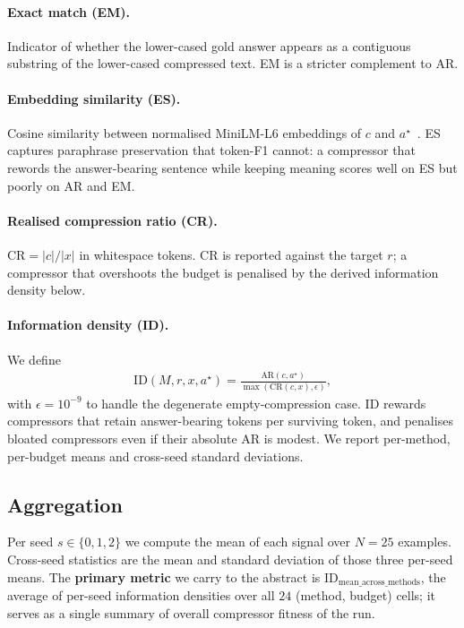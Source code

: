 \documentclass[11pt]{article}
\begin{document}
\paragraph{Exact match (EM).}
Indicator of whether the lower-cased gold answer appears as a
contiguous substring of the lower-cased compressed text. EM is a
stricter complement to AR.

\paragraph{Embedding similarity (ES).}
Cosine similarity between normalised MiniLM-L6 embeddings of $c$ and
$a^{\star}$~\citep{reimers2019sentencebert}. ES captures paraphrase
preservation that token-F1 cannot: a compressor that rewords the
answer-bearing sentence while keeping meaning scores well on ES but
poorly on AR and EM.

\paragraph{Realised compression ratio (CR).}
$\mathrm{CR} = |c| / |x|$ in whitespace tokens. CR is reported against
the target $r$; a compressor that overshoots the budget is penalised
by the derived information density below.

\paragraph{Information density (ID).}
We define
\begin{align*}
 \mathrm{ID}(M, r, x, a^{\star}) =
 \frac{\mathrm{AR}(c, a^{\star})}{\max(\mathrm{CR}(c, x), \epsilon)},
\end{align*}
with $\epsilon = 10^{-9}$ to handle the degenerate empty-compression
case. ID rewards compressors that retain answer-bearing tokens per
surviving token, and penalises bloated compressors even if their
absolute AR is modest. We report per-method, per-budget means and
cross-seed standard deviations.

\subsection{Aggregation}
\label{sec:method-aggregation}

Per seed $s \in \{0, 1, 2\}$ we compute the mean of each signal over
$N = 25$ examples. Cross-seed statistics are the mean and standard
deviation of those three per-seed means. The \textbf{primary metric} we
carry to the abstract is
$\mathrm{ID}_{\mathrm{mean\_across\_methods}}$, the average of per-seed
information densities over all $24$ (method, budget) cells; it serves
as a single summary of overall compressor fitness of the run.
\end{document}

